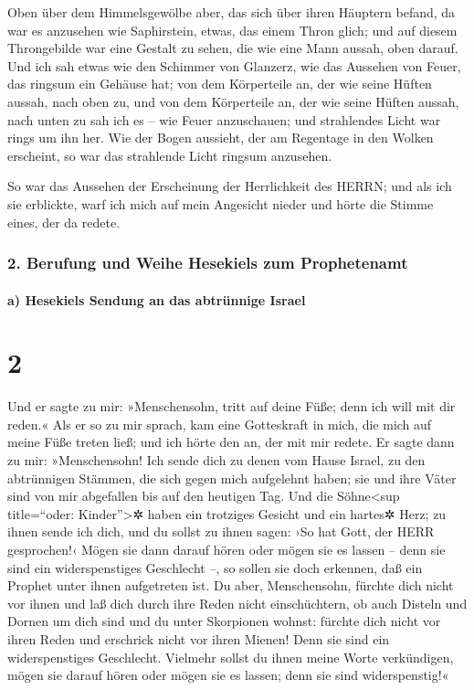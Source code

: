 Oben über dem Himmelsgewölbe aber, das sich über ihren
Häuptern befand, da war es anzusehen wie Saphirstein, etwas, das einem
Thron glich; und auf diesem Throngebilde war eine Gestalt zu sehen, die
wie eine Mann aussah, oben darauf. Und ich sah etwas wie
den Schimmer von Glanzerz, wie das Aussehen von Feuer, das ringsum ein
Gehäuse hat; von dem Körperteile an, der wie seine Hüften aussah, nach
oben zu, und von dem Körperteile an, der wie seine Hüften aussah, nach
unten zu sah ich es -- wie Feuer anzuschauen; und strahlendes Licht war
rings um ihn her. Wie der Bogen aussieht, der am
Regentage in den Wolken erscheint, so war das strahlende Licht ringsum
anzusehen.

So war das Aussehen der Erscheinung der Herrlichkeit des HERRN; und als
ich sie erblickte, warf ich mich auf mein Angesicht nieder und hörte die
Stimme eines, der da redete.

\hypertarget{berufung-und-weihe-hesekiels-zum-prophetenamt}{%
\subsubsection{2. Berufung und Weihe Hesekiels zum
Prophetenamt}\label{berufung-und-weihe-hesekiels-zum-prophetenamt}}

\hypertarget{a-hesekiels-sendung-an-das-abtruxfcnnige-israel}{%
\paragraph{a) Hesekiels Sendung an das abtrünnige
Israel}\label{a-hesekiels-sendung-an-das-abtruxfcnnige-israel}}

\hypertarget{section-1}{%
\section{2}\label{section-1}}

Und er sagte zu mir: »Menschensohn, tritt auf deine Füße;
denn ich will mit dir reden.« Als er so zu mir sprach, kam
eine Gotteskraft in mich, die mich auf meine Füße treten ließ; und ich
hörte den an, der mit mir redete. Er sagte dann zu mir:
»Menschensohn! Ich sende dich zu denen vom Hause Israel, zu den
abtrünnigen Stämmen, die sich gegen mich aufgelehnt haben; sie und ihre
Väter sind von mir abgefallen bis auf den heutigen Tag.
Und die Söhne\textless sup title=``oder:
Kinder''\textgreater✲ haben ein trotziges Gesicht und ein hartes✲ Herz;
zu ihnen sende ich dich, und du sollst zu ihnen sagen: ›So hat Gott, der
HERR gesprochen!‹ Mögen sie dann darauf hören oder mögen
sie es lassen -- denn sie sind ein widerspenstiges Geschlecht --, so
sollen sie doch erkennen, daß ein Prophet unter ihnen aufgetreten ist.
Du aber, Menschensohn, fürchte dich nicht vor ihnen und
laß dich durch ihre Reden nicht einschüchtern, ob auch Disteln und
Dornen um dich sind und du unter Skorpionen wohnst: fürchte dich nicht
vor ihren Reden und erschrick nicht vor ihren Mienen! Denn sie sind ein
widerspenstiges Geschlecht. Vielmehr sollst du ihnen meine
Worte verkündigen, mögen sie darauf hören oder mögen sie es lassen; denn
sie sind widerspenstig!«


